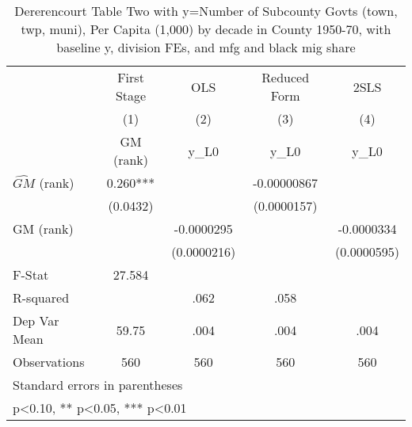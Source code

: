 \begin{table}[htbp]\centering
\def\sym#1{\ifmmode^{#1}\else\(^{#1}\)\fi}
\caption{Dererencourt Table Two with y=Number of Subcounty Govts (town, twp, muni), Per Capita (1,000) by decade in County 1950-70, with baseline y, division FEs, and mfg and black mig share}
\begin{tabular}{l*{4}{c}}
\toprule
                    & First Stage   &         OLS   &Reduced Form   &        2SLS   \\
                    &\multicolumn{1}{c}{(1)}&\multicolumn{1}{c}{(2)}&\multicolumn{1}{c}{(3)}&\multicolumn{1}{c}{(4)}\\
                    &\multicolumn{1}{c}{GM  (rank)}&\multicolumn{1}{c}{y\_L0}&\multicolumn{1}{c}{y\_L0}&\multicolumn{1}{c}{y\_L0}\\
\midrule
$\hat{GM}$ (rank)   &       0.260***&               & -0.00000867   &               \\
                    &    (0.0432)   &               & (0.0000157)   &               \\
\addlinespace
GM  (rank)          &               &  -0.0000295   &               &  -0.0000334   \\
                    &               & (0.0000216)   &               & (0.0000595)   \\
\midrule
F-Stat              &      27.584   &               &               &               \\
R-squared           &               &        .062   &        .058   &               \\
Dep Var Mean        &       59.75   &        .004   &        .004   &        .004   \\
Observations        &         560   &         560   &         560   &         560   \\
\bottomrule
\multicolumn{5}{l}{\footnotesize Standard errors in parentheses}\\
\multicolumn{5}{l}{\footnotesize * p<0.10, ** p<0.05, *** p<0.01}\\
\end{tabular}
\end{table}
